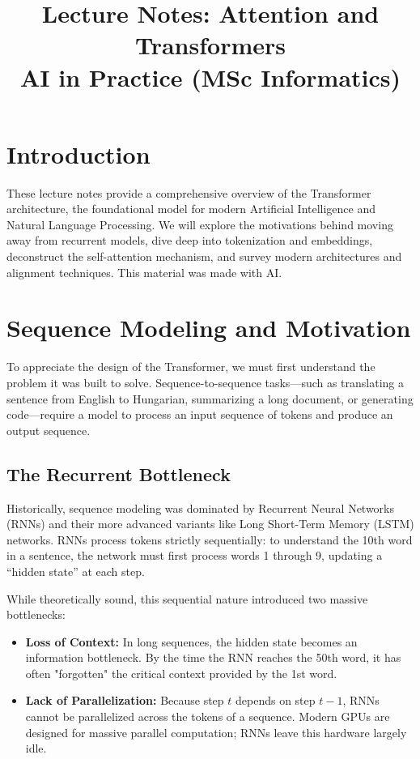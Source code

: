 \documentclass[11pt, a4paper]{article}
\title{\textbf{Lecture Notes: Attention and Transformers}\\ \Large AI in Practice (MSc Informatics)}
\begin{document}
\maketitle

\tableofcontents
\newpage

\section{Introduction}

These lecture notes provide a comprehensive overview of the Transformer architecture, the foundational model for modern Artificial Intelligence and Natural Language Processing. We will explore the motivations behind moving away from recurrent models, dive deep into tokenization and embeddings, deconstruct the self-attention mechanism, and survey modern architectures and alignment techniques. This material was made with AI.

\section{Sequence Modeling and Motivation}

To appreciate the design of the Transformer, we must first understand the problem it was built to solve. Sequence-to-sequence tasks---such as translating a sentence from English to Hungarian, summarizing a long document, or generating code---require a model to process an input sequence of tokens and produce an output sequence. 

\subsection{The Recurrent Bottleneck}
Historically, sequence modeling was dominated by Recurrent Neural Networks (RNNs) and their more advanced variants like Long Short-Term Memory (LSTM) networks. RNNs process tokens strictly sequentially: to understand the 10th word in a sentence, the network must first process words 1 through 9, updating a ``hidden state'' at each step. 

While theoretically sound, this sequential nature introduced two massive bottlenecks:
\begin{itemize}[leftmargin=*]
    \item \textbf{Loss of Context:} In long sequences, the hidden state becomes an information bottleneck. By the time the RNN reaches the 50th word, it has often "forgotten" the critical context provided by the 1st word.
    \item \textbf{Lack of Parallelization:} Because step $t$ depends on step $t-1$, RNNs cannot be parallelized across the tokens of a sequence. Modern GPUs are designed for massive parallel computation; RNNs leave this hardware largely idle.
\end{itemize}
\end{document}
